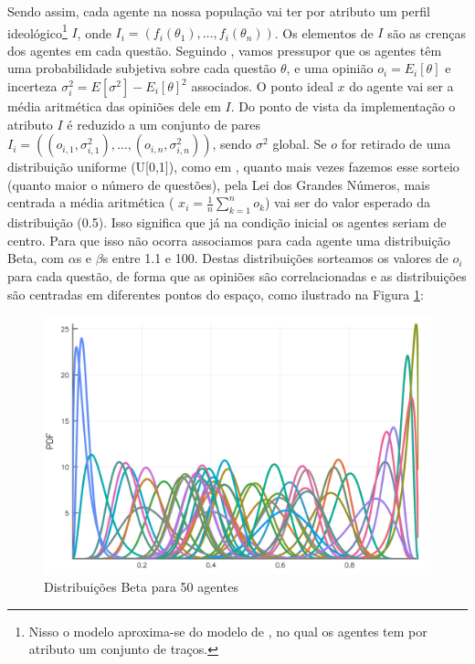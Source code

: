 Sendo assim, cada agente na nossa população vai ter por atributo um perfil
ideológico\footnote{Nisso o modelo aproxima-se do modelo de
  , no qual os agentes tem por atributo um
  conjunto de traços.} \(I\), onde \(I_i = (f_i(\theta_1), \ldots, f_i(\theta_n)) \). Os
elementos de \(I\) são as crenças dos agentes em cada questão. Seguindo
, vamos pressupor que os agentes têm uma
probabilidade subjetiva sobre cada questão \(\theta\), e uma opinião \( o_i =
E_i[\theta]\) e incerteza \( \sigma_i^2 = E[\sigma^2] - E_ i[\theta]^2\) associados. O ponto ideal
\(x\) do agente vai ser a média aritmética das opiniões dele em \(I\). Do ponto
de vista da implementação o atributo \(I\) é reduzido a um conjunto de pares
\(I_i = ((o_{i,1},\sigma_{i,1}^2), \ldots, (o_{i,n}, \sigma_{i,n}^2) )\), sendo \(\sigma^2\) global.
Se \(o\) for retirado de uma distribuição uniforme (U[0,1]), como em
, quanto mais vezes fazemos esse sorteio (quanto
maior o número de questões), pela Lei dos Grandes Números, mais centrada a média
aritmética ( \(x_i = \frac{1}{n}\sum_{k=1}^{n} o_k\)) vai ser do valor esperado da
distribuição (0.5). Isso significa que já na condição inicial os agentes seriam
de centro. Para que isso não ocorra associamos para cada agente uma distribuição
Beta, com \(\alpha\)s e \(\beta\)s entre 1.1 e 100. Destas distribuições sorteamos os
valores de \(o_i\) para cada questão, de forma que as opiniões são
correlacionadas e as distribuições são centradas em diferentes pontos do espaço,
como ilustrado na Figura \ref{fig:betas100}:

\begin{figure}[H]
  \centering
  \includegraphics[width=\textwidth]{ims/beta100.png}
  \caption{Distribuições Beta para 50 agentes}
  \label{fig:betas100}
\end{figure}


